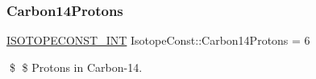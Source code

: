 \subsubsection{\texorpdfstring{Carbon14\+Protons}{Carbon14Protons}}
{\footnotesize\ttfamily \mbox{\hyperlink{group___isotope_const-_macros_ga5f18360b3e99483a35c32d789e62621c}{I\+S\+O\+T\+O\+P\+E\+C\+O\+N\+S\+T\+\_\+\+I\+NT}} Isotope\+Const\+::\+Carbon14\+Protons = 6}

\$ \$ Protons in Carbon-\/14. 